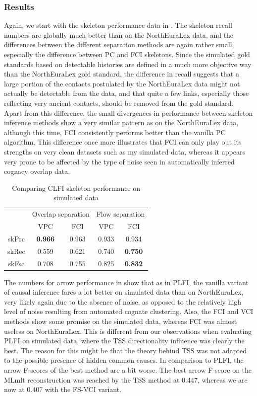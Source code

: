 \subsubsection{Results}
Again, we start with the skeleton performance data in . The skeleton recall numbers are globally much better than on the NorthEuraLex data, and the differences between the different separation methods are again rather small, especially the difference between PC and FCI skeletons. Since the simulated gold standards based on detectable histories are defined in a much more objective way than the NorthEuraLex gold standard, the difference in recall suggests that a large portion of the contacts postulated by the NorthEuraLex data might not actually be detectable from the data, and that quite a few links, especially those reflecting very ancient contacts, should be removed from the gold standard. Apart from this difference, the small divergences in performance between skeleton inference methods show a very similar pattern as on the NorthEuraLex data, although this time, FCI consistently performs better than the vanilla PC algorithm. This difference once more illustrates that FCI can only play out its strengths on very clean datasets such as my simulated data, whereas it appears very prone to be affected by the type of noise seen in automatically inferred cognacy overlap data.

\begin{table}
 \centering
 \begin{tabular}{ccccc}
 \hline \hline
   & \multicolumn{2}{l}{Overlap separation} & \multicolumn{2}{l}{Flow separation}\\ 
   & VPC & FCI & VPC & FCI\\ 
 \hline
  skPrc & \textbf{0.966} & 0.963 & 0.933 & 0.934\\
  skRec & 0.559 & 0.621 & 0.740 & \textbf{0.750}\\
  skFsc & 0.708 & 0.755 & 0.825 & \textbf{0.832}\\
  \hline
 \end{tabular}
 \caption{Comparing CLFI skeleton performance on simulated data}
 \label{contact-skeleton-evaluation-simulated}
\end{table}

The numbers for arrow performance in  show that as in PLFI, the vanilla variant of causal inference fares a lot better on simulated data than on NorthEuraLex, very likely again due to the absence of noise, as opposed to the relatively high level of noise resulting from automated cognate clustering. Also, the FCI and VCI methods show some promise on the simulated data, whereas FCI was almost useless on NorthEuraLex. This is different from our observations when evaluating PLFI on simulated data, where the TSS directionality influence was clearly the best. The reason for this might be that the theory behind TSS was not adapted to the possible presence of hidden common causes. In comparison to PLFI, the arrow F-scores of the best method are a bit worse. The best arrow F-score on the MLmlt reconstruction was reached by the TSS method at 0.447, whereas we are now at 0.407 with the FS-VCI variant.

